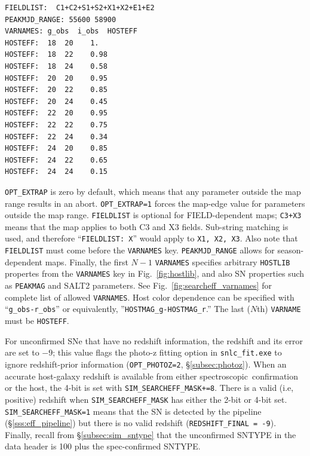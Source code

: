 \documentclass[12pt]{article}
\newcommand{\spec}{spectroscopic}
\begin{document}
{\begin{Verbatim}[frame=single]
FIELDLIST:  C1+C2+S1+S2+X1+X2+E1+E2
PEAKMJD_RANGE: 55600 58900 
VARNAMES: g_obs  i_obs  HOSTEFF
HOSTEFF:  18  20    1.
HOSTEFF:  18  22    0.98
HOSTEFF:  18  24    0.58
HOSTEFF:  20  20    0.95
HOSTEFF:  20  22    0.85
HOSTEFF:  20  24    0.45
HOSTEFF:  22  20    0.95
HOSTEFF:  22  22    0.75
HOSTEFF:  22  24    0.34
HOSTEFF:  24  20    0.85
HOSTEFF:  24  22    0.65
HOSTEFF:  24  24    0.15
\end{Verbatim} 
%
{\tt OPT\_EXTRAP} is zero by default, which means that any 
parameter outside the map range results in an abort.
{\tt OPT\_EXTRAP=1} forces the map-edge value for parameters outside 
the map range. {\tt FIELDLIST} is optional for FIELD-dependent maps;
{\tt C3+X3} means that the map applies to both C3 and X3 fields.
Sub-string matching is used, and therefore ``{\tt FIELDLIST: X}'' 
would apply to {\tt X1, X2, X3}.
Also note that {\tt FIELDLIST} must come before the {\tt VARNAMES} key.
{\tt PEAKMJD\_RANGE} allows for season-dependent maps.
Finally, the first $N-1$ {\tt VARNAMES} specifies arbitrary
{\tt HOSTLIB} propertes from the {\tt VARNAMES} key in 
Fig.~\ref{fig:hostlib}, and also SN properties such as {\tt PEAKMAG}
and SALT2 parameters. See Fig.~\ref{fig:searcheff_varnames} for
complete list of allowed {\tt VARNAMES}.
Host color dependence can be specified with ``\verb|g_obs-r_obs|''
or equivalently, ''\verb|HOSTMAG_g-HOSTMAG_r|.''
The last ($N$th) {\tt VARNAME} must be {\tt HOSTEFF}.


For unconfirmed SNe that have no redshift information,
the redshift and its error are set to $-9$; 
this value flags the photo-z fitting option in {\tt snlc\_fit.exe}
to ignore redshift-prior information
({\tt OPT\_PHOTOZ=2}, \S\ref{subsec:photoz}).
When an accurate host-galaxy redshift is available from either 
\spec\ confirmation or the host,
the 4-bit is set with {\tt SIM\_SEARCHEFF\_MASK+=8}. 
There is a valid (i.e, positive) redshift when 
\verb|SIM_SEARCHEFF_MASK| has either the 2-bit or 4-bit set.
\verb|SIM_SEARCHEFF_MASK=1| means that the SN is
detected by the pipeline (\S\ref{sss:eff_pipeline})
but there is no valid redshift
(\verb|REDSHIFT_FINAL = -9|).
Finally, recall from \S\ref{subsec:sim_sntype} 
that the unconfirmed SNTYPE in the data header is 
100 plus the spec-confirmed SNTYPE.

}
\end{document}
